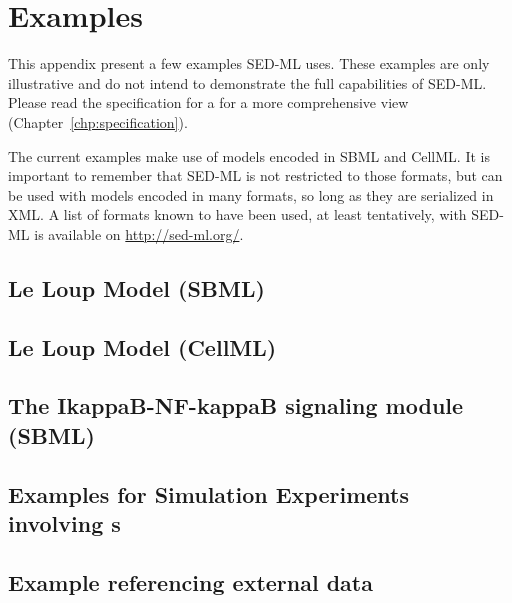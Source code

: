 \chapter{Examples}

This appendix present a few examples SED-ML uses. These examples are only illustrative and do not intend to demonstrate the full capabilities of SED-ML. Please read the specification for  a for a more comprehensive view (Chapter~\ref{chp:specification}). 

The current examples make use of models encoded in SBML and CellML. It is important to remember that SED-ML is not restricted to those formats, but can be used with models encoded in many formats, so long as they are serialized in XML. A list of formats known to have been used, at least tentatively, with SED-ML is available on \url{http://sed-ml.org/}.

\section{Le Loup Model (SBML)}


\section{Le Loup Model (CellML)}


\newpage
\section{The IkappaB-NF-kappaB signaling module (SBML)}


\section{Examples for Simulation Experiments involving s}


\section{Example referencing external data}


